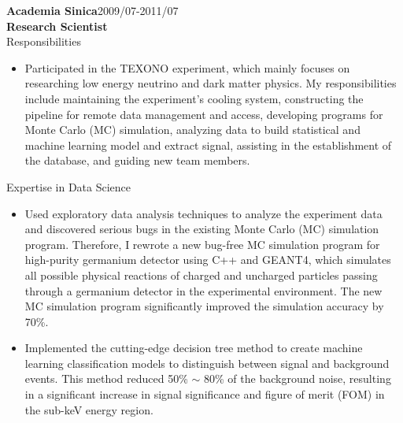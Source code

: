 \documentclass[margin, 10pt]{res} %
\begin{document}
\begin{resume}
\textbf{Academia Sinica}\hfill{2009/07-2011/07}\\
\textbf{Research Scientist}\\
\textrm{Responsibilities}
\begin{itemize}
    \item Participated in the TEXONO experiment, which mainly focuses on researching low energy neutrino and dark matter physics. My responsibilities include maintaining the experiment's cooling system, constructing the pipeline for remote data management and access, developing programs for Monte Carlo (MC) simulation, analyzing data to build statistical and machine learning model and extract signal, assisting in the establishment of the database, and guiding new team members.
\end{itemize}
\textrm{Expertise in Data Science}
\begin{itemize}
    \item Used exploratory data analysis techniques to analyze the experiment data and discovered serious bugs in the existing Monte Carlo (MC) simulation program. Therefore, I rewrote a new bug-free MC simulation program for high-purity germanium detector using C++ and GEANT4, which simulates all possible physical reactions of charged and uncharged particles passing through a germanium detector in the experimental environment. The new MC simulation program significantly improved the simulation accuracy by 70\%.
    \item Implemented the cutting-edge decision tree method to create machine learning classification models to distinguish between signal and background events. This method reduced 50\% $\sim$ 80\% of the background noise, resulting in a significant increase in signal significance and figure of merit (FOM) in the sub-keV energy region.

\end{itemize}
\end{resume}
\end{document}
